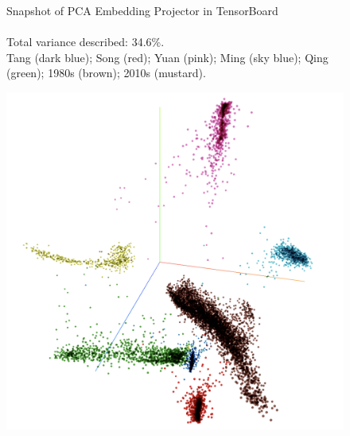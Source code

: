 \begin{figure}[H]
\begin{minipage}[b]{0.45\linewidth}
  \end{minipage}
  \caption[Snapshot of PCA Embedding Projector in TensorBoard]%
  {Snapshot of PCA Embedding Projector in TensorBoard\\%
    \footnotesize{\\\text{*} Total variance described: 34.6\%.\\\text{*} Tang (dark blue); Song (red); Yuan (pink); Ming (sky blue); Qing (green); 1980s (brown); 2010s (mustard).}}  
\end{figure}

\begin{figure}[H]
  \centering
  \begin{minipage}[b]{0.45\linewidth}
    \includegraphics[width=\textwidth]{figures_new/from_old/tsne_embedding_projector_67}
  \end{minipage}
  \quad
  \begin{minipage}[b]{0.45\linewidth}

\end{minipage}
\end{figure}
